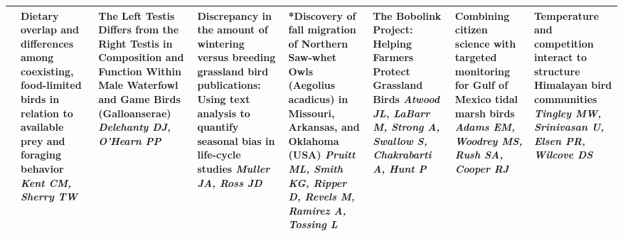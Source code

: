 \begin{tabular}{|x{0.85cm}|x{2.85cm}|x{2.85cm}|x{2.85cm}|x{2.85cm}|a{2.85cm}|a{2.85cm}|a{2.85cm}|}
&Dietary overlap and differences among coexisting, food-limited birds in relation to available prey and foraging behavior \newline \newline \textit{Kent CM, Sherry TW} & The Left Testis Differs from the Right Testis in Composition and Function Within Male Waterfowl and Game Birds (Galloanserae) \newline \newline \textit{Delehanty DJ, O'Hearn PP} & Discrepancy in the amount of wintering versus breeding grassland bird publications: Using text analysis to quantify seasonal bias in life-cycle studies \newline \newline \textit{Muller JA, Ross JD} & *Discovery of fall migration of Northern Saw-whet Owls (Aegolius acadicus) in Missouri, Arkansas, and Oklahoma (USA) \newline \newline \textit{Pruitt ML, Smith KG, Ripper D, Revels M, Ramirez A, Tossing L} & The Bobolink Project: Helping Farmers Protect Grassland Birds \newline \newline \textit{Atwood JL, LaBarr M, Strong A, Swallow S, Chakrabarti A, Hunt P} & Combining citizen science with targeted monitoring for Gulf of Mexico tidal marsh birds \newline \newline \textit{Adams EM, Woodrey MS, Rush SA, Cooper RJ} & Temperature and competition interact to structure Himalayan bird communities \newline \newline \textit{Tingley MW, Srinivasan U, Elsen PR, Wilcove DS}\\
\hline

\end{tabular}
